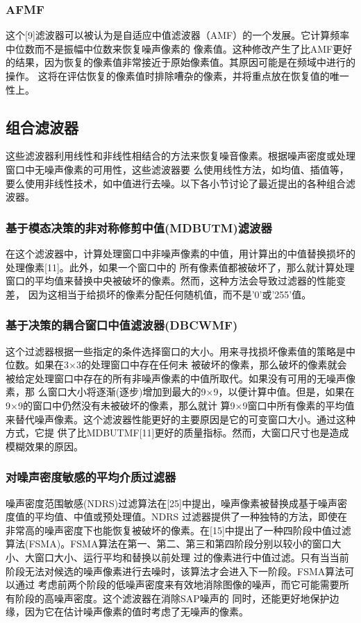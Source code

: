 \documentclass{article} %
\begin{document}
\subsubsection{AFMF}
这个[9]滤波器可以被认为是自适应中值滤波器（AMF）的一个发展。它计算频率中位数而不是振幅中位数来恢复噪声像素的
像素值。这种修改产生了比AMF更好的结果，因为恢复的像素值非常接近于原始像素值。其原因可能是在频域中进行的操作。
这将在评估恢复的像素值时排除嘈杂的像素，并将重点放在恢复值的唯一性上。

\subsection{组合滤波器}
这些滤波器利用线性和非线性相结合的方法来恢复噪音像素。根据噪声密度或处理窗口中无噪声像素的可用性，这些滤波器要
么使用线性方法，如均值、插值等，要么使用非线性技术，如中值进行去噪。以下各小节讨论了最近提出的各种组合滤波器。

\subsubsection{基于模态决策的非对称修剪中值(MDBUTM)滤波器}
在这个滤波器中，计算处理窗口中非噪声像素的中值，用计算出的中值替换损坏的处理像素[11]。此外，如果一个窗口中的
所有像素值都被破坏了，那么就计算处理窗口的平均值来替换中央被破坏的像素。然而，这种方法会导致过滤器的性能变差，
因为这相当于给损坏的像素分配任何随机值，而不是'0'或'255'值。

\subsubsection{基于决策的耦合窗口中值滤波器(DBCWMF)}
这个过滤器根据一些指定的条件选择窗口的大小。用来寻找损坏像素值的策略是中位数。如果在3×3的处理窗口中存在任何未
被破坏的像素，那么破坏的像素就会被给定处理窗口中存在的所有非噪声像素的中值所取代。如果没有可用的无噪声像素，那
么窗口大小将逐渐(逐步)增加到最大的9×9，以便计算中值。但是，如果在9×9的窗口中仍然没有未被破坏的像素，那么就计
算9×9窗口中所有像素的平均值来替代噪声像素。这个滤波器性能更好的主要原因是它的可变窗口大小。通过这种方式，它提
供了比MDBUTMF[11]更好的质量指标。然而，大窗口尺寸也是造成模糊效果的原因。

\subsubsection{对噪声密度敏感的平均介质过滤器}
噪声密度范围敏感(NDRS)过滤算法在[25]中提出，噪声像素被替换成基于噪声密度值的平均值、中值或预处理值。NDRS
过滤器提供了一种独特的方法，即使在非常高的噪声密度下也能恢复被破坏的像素。在[15]中提出了一种四阶段中值过滤
算法(FSMA)。FSMA算法在第一、第二、第三和第四阶段分别以较小的窗口大小、大窗口大小、运行平均和替换以前处理
过的像素进行中值过滤。只有当当前阶段无法对候选的噪声像素进行去噪时，该算法才会进入下一阶段。FSMA算法可以通过
考虑前两个阶段的低噪声密度来有效地消除图像的噪声，而它可能需要所有阶段的高噪声密度。这个滤波器在消除SAP噪声的
同时，还能更好地保护边缘，因为它在估计噪声像素的值时考虑了无噪声的像素。
\end{document}

